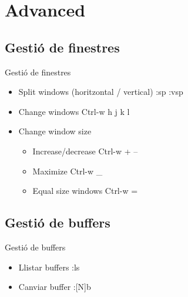 \documentclass{beamer}
\begin{document}
\section{Advanced}
    \subsection{Gestió de finestres}
    \begin{frame}{Gestió de finestres}
        \begin{itemize}
            \item Split windows (horitzontal / vertical) \alert{:sp :vsp}
            \item Change windows \alert{Ctrl-w h j k l}
            \item Change window size
                \begin{itemize}
                    \item Increase/decrease \alert{Ctrl-w + --}
                    \item Maximize \alert{Ctrl-w \_ }
                    \item Equal size windows \alert{Ctrl-w = }
                \end{itemize}
        \end{itemize}
    \end{frame}

    \subsection{Gestió de buffers}
    \begin{frame}{Gestió de buffers}
        \begin{itemize}
            \item Llistar buffers \alert{:ls}
            \item Canviar buffer \alert{:[N]b}
        \end{itemize}
    \end{frame}
\end{document}
